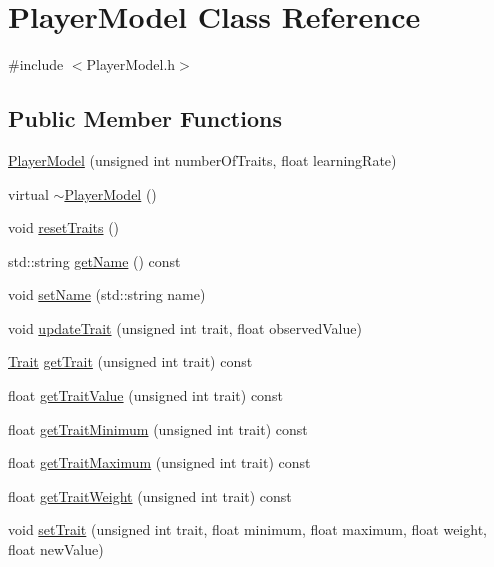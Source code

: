 \hypertarget{class_player_model}{
\section{PlayerModel Class Reference}
\label{de/d93/class_player_model}
}


{\ttfamily \#include $<$PlayerModel.h$>$}

\subsection*{Public Member Functions}
\begin{DoxyCompactItemize}
\item 
\hyperlink{class_player_model_aa14718e35d660f2c0dd52fef781ed5e7}{PlayerModel} (unsigned int numberOfTraits, float learningRate)
\item 
virtual \hyperlink{class_player_model_ac72aa34f2769aff6bed1ebe198454769}{$\sim$PlayerModel} ()
\item 
void \hyperlink{class_player_model_ac11028344d538fad0a2688fcfd4d47d9}{resetTraits} ()
\item 
std::string \hyperlink{class_player_model_abe91969a3824190bc385c0944f37faf6}{getName} () const 
\item 
void \hyperlink{class_player_model_ab7829d2b2cf9fb73fab6e7be253b83ad}{setName} (std::string name)
\item 
void \hyperlink{class_player_model_a4ad3b83f22c1befc44d7d92b5f1ca743}{updateTrait} (unsigned int trait, float observedValue)
\item 
\hyperlink{struct_trait}{Trait} \hyperlink{class_player_model_aa704b2b339f518d1a1873a6030deae22}{getTrait} (unsigned int trait) const 
\item 
float \hyperlink{class_player_model_aca0b90dbad6f7457dea6650d49878091}{getTraitValue} (unsigned int trait) const 
\item 
float \hyperlink{class_player_model_ab023d5221a4b45e907b750dc5d2bbfaa}{getTraitMinimum} (unsigned int trait) const 
\item 
float \hyperlink{class_player_model_a39ddf0e8975c03a4dc286fbd566db736}{getTraitMaximum} (unsigned int trait) const 
\item 
float \hyperlink{class_player_model_a5e3f6d68b1ee086a73fd731262aeebf2}{getTraitWeight} (unsigned int trait) const 
\item 
void \hyperlink{class_player_model_accc42590cd874df5af3a9c09e50b4d83}{setTrait} (unsigned int trait, float minimum, float maximum, float weight, float newValue)

\end{DoxyCompactItemize}
